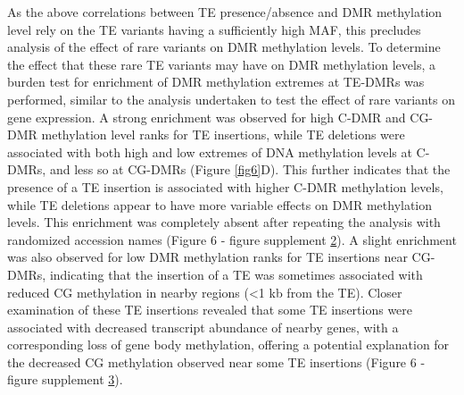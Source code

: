 \documentclass[12pt]{article}
\begin{document}
As the above correlations between TE presence/absence and DMR
methylation level rely on the TE variants having a sufficiently high
MAF, this precludes analysis of the effect of rare variants on DMR
methylation levels. To determine the effect that these rare TE
variants may have on DMR methylation levels, a burden test for
enrichment of DMR methylation extremes at TE-DMRs was performed,
similar to the analysis undertaken to test the effect of rare variants
on gene expression. A strong enrichment was observed for high C-DMR
and CG-DMR methylation level ranks for TE insertions, while TE
deletions were associated with both high and low extremes of DNA
methylation levels at C-DMRs, and less so at CG-DMRs (Figure
\ref{fig6}D). This further indicates that the presence of a TE insertion
is associated with higher C-DMR methylation levels, while TE deletions
appear to have more variable effects on DMR methylation levels. This
enrichment was completely absent after repeating the analysis with
randomized accession names (Figure 6 - figure supplement
\hyperref[fig6s2]{2}). A slight enrichment was also observed for low
DMR methylation ranks for TE insertions near CG-DMRs, indicating that
the insertion of a TE was sometimes associated with reduced CG
methylation in nearby regions (\textless{}1 kb from the TE). Closer
examination of these TE insertions revealed that some TE insertions
were associated with decreased transcript abundance of nearby genes,
with a corresponding loss of gene body methylation, offering a
potential explanation for the decreased CG methylation observed near
some TE insertions (Figure 6 - figure supplement
\hyperref[fig6s3]{3}).
\end{document}
